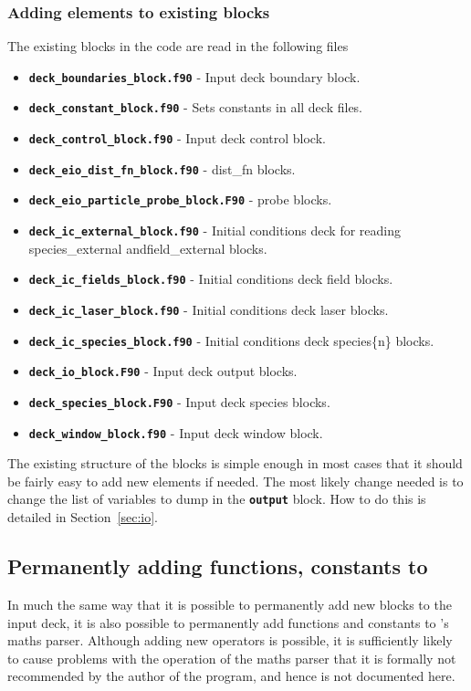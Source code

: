 \documentclass[12pt,a4paper]{article}
\newcommand{\inlinecode}[1]{{\color{warwickred} \bf\texttt{#1}}}
\newcommand{\sect}[1]{Section~\ref{sec:#1}}
\newcommand{\EPOCH}{{\color{warwickdark}\fontfamily{phv}\selectfont{EPOCH}}}
\begin{document}
\subsubsection{Adding elements to existing blocks}
The existing blocks in the code are read in the following files
\begin{itemize}
\item \inlinecode{deck\_boundaries\_block.f90} - Input deck boundary block.
\item \inlinecode{deck\_constant\_block.f90} - Sets constants in all deck files.
\item \inlinecode{deck\_control\_block.f90} - Input deck control block.
\item \inlinecode{deck\_eio\_dist\_fn\_block.f90} - dist\_fn blocks.
\item \inlinecode{deck\_eio\_particle\_probe\_block.F90} - probe blocks.
\item \inlinecode{deck\_ic\_external\_block.f90} - Initial conditions deck for
  reading species\_external and\linebreak field\_external blocks.
\item \inlinecode{deck\_ic\_fields\_block.f90} - Initial conditions deck field
  blocks.
\item \inlinecode{deck\_ic\_laser\_block.f90} - Initial conditions deck laser
  blocks.
\item \inlinecode{deck\_ic\_species\_block.f90} - Initial conditions deck
  species\{n\} blocks.
\item \inlinecode{deck\_io\_block.F90} - Input deck output blocks.
\item \inlinecode{deck\_species\_block.F90} - Input deck species blocks.
\item \inlinecode{deck\_window\_block.f90} - Input deck window block.
\end{itemize}

The existing structure of the blocks is simple enough in most cases that it
should be fairly easy to add new elements if needed. The most likely change
needed is to change the list of variables to dump in the \inlinecode{output}
block. How to do this is detailed in \sect{io}.

\subsection{Permanently adding functions, constants to {\EPOCH}}
\label{sec:maths}
In much the same way that it is possible to permanently add new blocks to the
input deck, it is also possible to permanently add functions and constants to
{\EPOCH}'s maths parser. Although adding new operators is possible, it is
sufficiently likely to cause problems with the operation of the maths parser
that it is formally not recommended by the author of the program, and hence is
not documented here.
\end{document}
